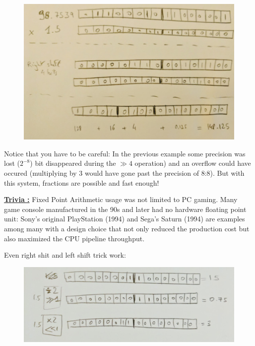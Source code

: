 \par
\begin{figure}[H]
  \centering
 \includegraphics[width=\textwidth]{imgs/fixed_point_multiplication.png}
\end{figure}
\par

Notice that you have to be careful: In the previous example some precision was lost ($ 2^{-8}$) bit disappeared during the $\gg 4$ operation) and an overflow could have occured (multiplying by 3 would have gone past the precision of 8:8). But with this system, fractions are possible and fast enough!\\
\par

 
\par
 \textbf{\underline{Trivia :}}  Fixed Point Arithmetic usage was not limited to PC gaming. Many game console manufactured in the 90s and later had no hardware floating point unit: Sony's original PlayStation (1994) and Sega's Saturn (1994) are examples among many with a design choice that not only reduced the production cost but also maximized the CPU pipeline throughput.
 
 Even right shit and left shift trick work:\\
 
\begin{figure}[H]
  \centering
 \includegraphics[width=\textwidth]{imgs/fixed_point_shifts.png}
\end{figure}
\par
 
